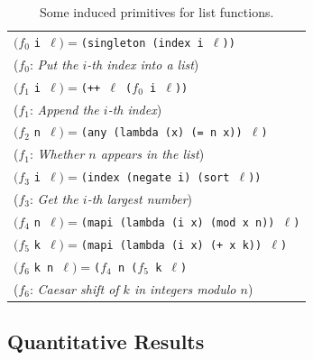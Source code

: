 \documentclass{article}
\newcommand{\code}[1]{{\footnotesize\texttt{#1}}}
\begin{document}
\begin{table}[t]
  \centering
  \begin{tabular}{l}
    \toprule
    $(f_0$ \code{i $\ell$}$) = $\code{(singleton (index i $\ell$))}\\
    \hspace{0.5cm}($f_0$: \emph{Put the $i$-th index into a list})\\
    $(f_1$ \code{i $\ell$}$) = $\code{(++ $\ell$ ($f_0$ i $\ell$))}\\
    \hspace{0.5cm}($f_1$: \emph{Append the $i$-th index})\\
    $(f_2$ \code{n $\ell$}$) = $\code{(any (lambda (x) (= n x)) $\ell$)}\\
    \hspace{0.5cm}($f_1$: \emph{Whether $n$ appears in the list})\\
    $(f_3$ \code{i $\ell$}$) = $\code{(index (negate i) (sort $\ell$))}\\
    \hspace{0.5cm}($f_3$: \emph{Get the $i$-th largest number})\\
    $(f_4$ \code{n $\ell$}$) = $\code{(mapi (lambda (i x) (mod x n)) $\ell$)}\\
    $(f_5$ \code{k $\ell$}$) = $\code{(mapi (lambda (i x) (+ x k)) $\ell$)}\\
    $(f_6$ \code{k n $\ell$}$) = $\code{($f_4$ n ($f_5$ k $\ell$)}\\
    \hspace{0.5cm}($f_6$: \emph{Caesar shift of $k$ in integers modulo $n$})\\
  \bottomrule
  \end{tabular}
  \caption{Some induced primitives for list functions.}\label{listinduced}
\end{table}


\subsection{Quantitative Results}\label{quantitative}
\end{document}
